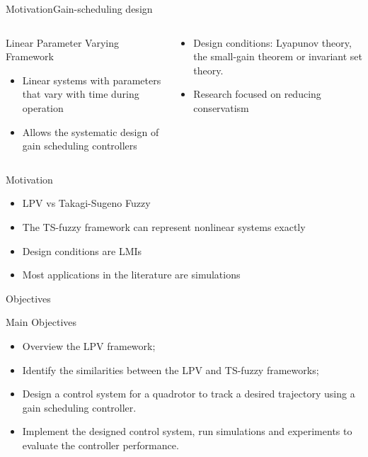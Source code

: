 \begin{frame}{Motivation}{Gain-scheduling design}
\begin{columns}
\begin{column}{0.45\textwidth}
\vspace{-0.10cm}
\begin{block}{Linear Parameter Varying Framework}
    \begin{itemize}
       \item Linear systems with parameters that vary with time during operation
       \item Allows the systematic design of gain scheduling controllers
   \end{itemize}
\end{block}
\end{column}
\begin{column}{0.5\textwidth}  %
	\vspace{0.50cm}
    \begin{itemize}
    	\item Design conditions: Lyapunov theory, the small-gain theorem or invariant set theory.
    	\item Research focused on reducing conservatism
    \end{itemize}
\end{column}
\end{columns}
\end{frame}

\begin{frame}{Motivation}{}
	    \begin{itemize}
	    	\item LPV vs Takagi-Sugeno Fuzzy 
	    	\item The TS-fuzzy framework can represent nonlinear systems exactly
	    	\item Design conditions are LMIs
	    	\item Most applications in the literature are simulations
	    \end{itemize}
\end{frame}


\begin{frame}{Objectives}


\begin{block}{Main Objectives}
\begin{itemize}
	\item Overview  the LPV framework;
	\item Identify the similarities between the LPV and TS-fuzzy frameworks;
	\item Design a control system for a quadrotor to track a desired trajectory using a gain scheduling controller.  
	\item Implement the designed control system, run simulations and experiments to evaluate the controller performance.
\end{itemize}
\end{block}
\end{frame}